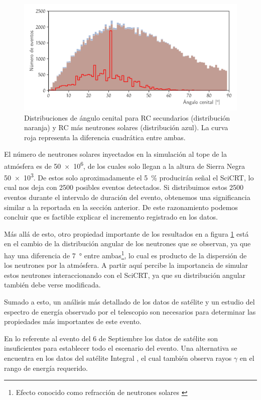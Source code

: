 \begin{figure}
        \centering
        \includegraphics[width=\textwidth]{solar-neutrons-angular.pdf}
        \caption{Distribuciones de ángulo cenital para RC secundarios (distribución naranja) y RC más neutrones solares (distribución azul). La curva roja representa la diferencia cuadrática entre ambas.}
        \label{fig:sn-angular}
\end{figure}

El número de neutrones solares inyectados en la simulación al tope de la atmósfera es de \num{50e6}, de los cuales solo llegan a la altura de Sierra Negra \num{50e3}. De estos solo aproximadamente el \SI{5}{\percent} producirán señal el SciCRT, lo cual nos deja con \num{2500} posibles eventos detectados. Si distribuimos estos \num{2500} eventos durante el intervalo de duración del evento, obtenemos una significancia similar a la reportada en la sección anterior. De este razonamiento podemos concluir que es factible explicar el incremento registrado en los datos.

Más allá de esto, otro propiedad importante de los resultados en a figura \ref{fig:sn-angular} está en el cambio de la distribución angular de los neutrones que se observan, ya que hay una diferencia de \SI{7}{\degree} entre ambas\footnote{Efecto conocido como refracción de neutrones solares \cite{dorman99}}, lo cual es producto de la dispersión de los neutrones por la atmósfera. A partir aquí percibe la importancia de simular estos neutrones interaccionando con el SciCRT, ya que su distribución angular también debe verse modificada.

Sumado a esto, un análisis más detallado de los datos de satélite y un estudio del espectro de energía observado por el telescopio son necesarios para determinar las propiedades más importantes de este evento.

En lo referente al evento del \num{6} de Septiembre los datos de satélite son insuficientes para establecer todo el escenario del evento. Una alternativa se encuentra en los datos del satélite Integral \cite{integraldata}, el cual también observa rayos $\gamma$ en el rango de energía requerido.

